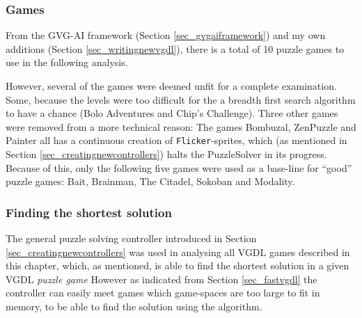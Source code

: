 \documentclass[a4paper,titlepage,final]{report}
\begin{document}
\subsubsection*{Games} 
From the GVG-AI framework (Section \ref{sec_gvgaiframework}) and my own additions (Section \ref{sec_writingnewvgdl}), there is a total of 10 puzzle games to use in the following analysis.

However, several of the games were deemed unfit for a complete examination.
Some, because the levels were too difficult for the a breadth first search algorithm to have a chance (Bolo Adventures and Chip's Challenge).
Three other games were removed from a more technical reason: 
The games Bombuzal, ZenPuzzle and Painter all has a continuous creation of \texttt{Flicker}-sprites, which (as mentioned in Section \ref{sec_creatingnewcontrollers})  halts the PuzzleSolver in its progress.
Because of this, only the following five games were used as a base-line for ``good'' puzzle games: Bait, Brainman, The Citadel, Sokoban and Modality.



\subsubsection*{Finding the shortest solution}
The general puzzle solving controller introduced in Section \ref{sec_creatingnewcontrollers} was used in analysing all VGDL games described in this chapter, which, as mentioned, is able to find the shortest solution in a given VGDL \textit{puzzle game}
However as indicated from Section \ref{sec_fastvgdl} the controller can easily meet games which game-spaces are too large to fit in memory, to be able to find the solution using the algorithm.
\end{document}
